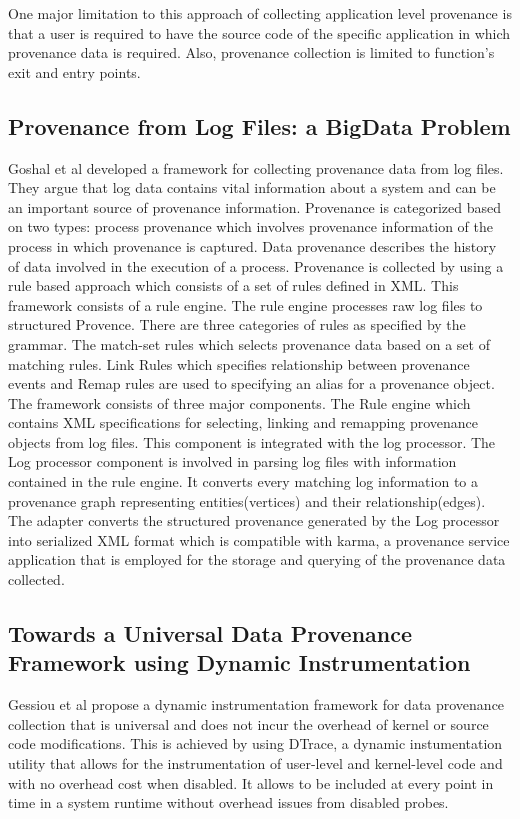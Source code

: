 One major limitation to this approach of collecting application level provenance is that a user is required to have the source code of the specific application in which provenance data is required. Also, provenance collection is limited to function's exit and entry points.


\subsection{Provenance from Log Files: a BigData Problem}


Goshal et al \cite{ghoshal_provenance_2013} developed a framework for collecting provenance data from log files. They argue that log data contains vital information about a system and can be an important source of provenance information. Provenance is categorized based on two types: process provenance which involves provenance information of the process in which provenance is captured. Data provenance describes the history of data involved in the execution of a process. Provenance is collected by using a rule based approach which consists of a set of rules defined in XML. This framework consists of a rule engine. The rule engine processes raw log files to structured Provence. There are three categories of rules as specified by the grammar. The match-set rules which selects provenance data based on a set of matching rules. Link Rules which specifies relationship between provenance events and Remap rules are used to specifying an alias for a provenance object. The framework consists of three major components. The Rule engine which contains XML specifications for selecting, linking and remapping provenance objects from log files. This component is integrated with the log processor. The Log processor component is involved in parsing log files with information contained in the rule engine. It converts every matching log information to a provenance graph representing entities(vertices) and their relationship(edges). The adapter converts the structured provenance generated by the Log processor into serialized XML format which is compatible with karma, a provenance service application that is employed for the storage and querying of the provenance data collected.




\subsection{Towards a Universal Data Provenance Framework using Dynamic Instrumentation}
Gessiou et al propose a dynamic instrumentation framework for data provenance collection that is universal and does not incur the overhead of kernel or source code modifications. This is achieved by using DTrace, a dynamic instumentation utility that allows for the instrumentation of user-level and kernel-level code and with no overhead cost when disabled. It allows to be included at every point in time in a system  runtime without overhead issues from disabled probes.

